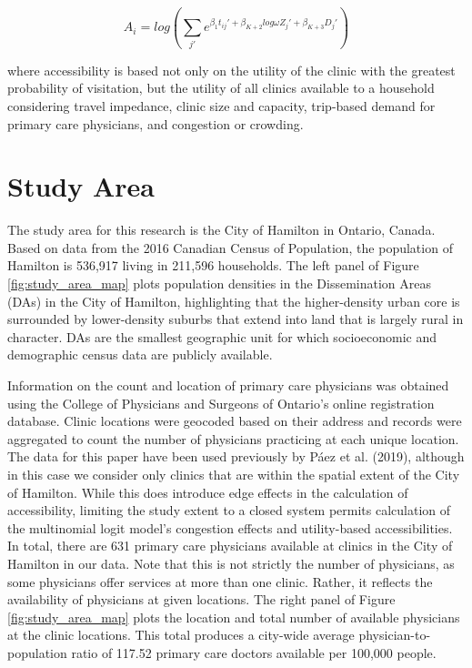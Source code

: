 \documentclass[]{elsarticle} %
\begin{document}
\begin{equation}
\label{eq:mnl_logsum}
A_i = log(\sum_{j\prime} e^{\beta_1 t_{ij}\prime + \beta_{K+2} log \omega Z_j\prime + \beta_{K + 3} D_j\prime})
\end{equation}

\noindent where accessibility is based not only on the utility of the
clinic with the greatest probability of visitation, but the utility of
all clinics available to a household considering travel impedance,
clinic size and capacity, trip-based demand for primary care physicians,
and congestion or crowding.

\hypertarget{study-area}{%
\section{Study Area}\label{study-area}}

The study area for this research is the City of Hamilton in Ontario,
Canada. Based on data from the 2016 Canadian Census of Population, the
population of Hamilton is 536,917 living in 211,596 households. The left
panel of Figure \ref{fig:study_area_map} plots population densities in
the Dissemination Areas (DAs) in the City of Hamilton, highlighting that
the higher-density urban core is surrounded by lower-density suburbs
that extend into land that is largely rural in character. DAs are the
smallest geographic unit for which socioeconomic and demographic census
data are publicly available.

Information on the count and location of primary care physicians was
obtained using the College of Physicians and Surgeons of Ontario's
online registration database. Clinic locations were geocoded based on
their address and records were aggregated to count the number of
physicians practicing at each unique location. The data for this paper
have been used previously by Páez et al. (2019), although in this case
we consider only clinics that are within the spatial extent of the City
of Hamilton. While this does introduce edge effects in the calculation
of accessibility, limiting the study extent to a closed system permits
calculation of the multinomial logit model's congestion effects and
utility-based accessibilities. In total, there are 631 primary care
physicians available at clinics in the City of Hamilton in our data.
Note that this is not strictly the number of physicians, as some
physicians offer services at more than one clinic. Rather, it reflects
the availability of physicians at given locations. The right panel of
Figure \ref{fig:study_area_map} plots the location and total number of
available physicians at the clinic locations. This total produces a
city-wide average physician-to-population ratio of 117.52 primary care
doctors available per 100,000 people.
\end{document}

